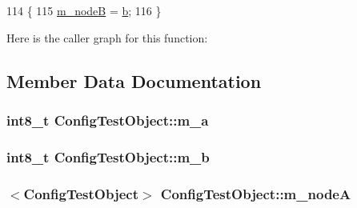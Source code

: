 \begin{DoxyCode}
114 \{
115   \hyperlink{classConfigTestObject_ae85745ade88bf5a10e052de02ca688bd}{m\_nodeB} = \hyperlink{buildings__pathloss_8m_a21ad0bd836b90d08f4cf640b4c298e7c}{b};
116 \}
\end{DoxyCode}


Here is the caller graph for this function\+:




\subsection{Member Data Documentation}
\subsubsection[{\texorpdfstring{m\+\_\+a}{m_a}}]{\setlength{\rightskip}{0pt plus 5cm}int8\+\_\+t Config\+Test\+Object\+::m\+\_\+a\hspace{0.3cm}{\ttfamily [private]}}\hypertarget{classConfigTestObject_a3b881f24b876b873471492fe6254509f}{}\label{classConfigTestObject_a3b881f24b876b873471492fe6254509f}
\subsubsection[{\texorpdfstring{m\+\_\+b}{m_b}}]{\setlength{\rightskip}{0pt plus 5cm}int8\+\_\+t Config\+Test\+Object\+::m\+\_\+b\hspace{0.3cm}{\ttfamily [private]}}\hypertarget{classConfigTestObject_acd1425a67fc80dc5d0b9c99d489b7360}{}\label{classConfigTestObject_acd1425a67fc80dc5d0b9c99d489b7360}
\subsubsection[{\texorpdfstring{m\+\_\+nodeA}{m_nodeA}}]{$<${\bf Config\+Test\+Object}$>$ Config\+Test\+Object\+::m\+\_\+nodeA\hspace{0.3cm}{\ttfamily [private]}}\hypertarget{classConfigTestObject_a5dce1b4faa3a921b41a7636ee25f0424}{}\label{classConfigTestObject_a5dce1b4faa3a921b41a7636ee25f0424}
